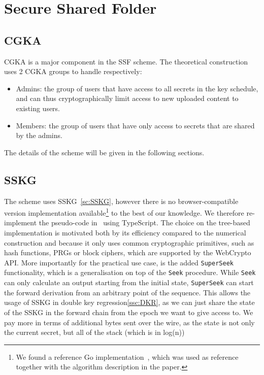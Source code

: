 \chapter{Secure Shared Folder}\label{ch:ssf}



\section{CGKA}

CGKA is a major component in the SSF scheme.
The theoretical construction uses 2 CGKA groups to handle respectively:

\begin{itemize}
    \item Admins: the group of users that have access to all secrets in the key schedule, and can thus cryptographically limit access to new uploaded content to existing users.
    \item Members: the group of users that have only access to secrets that are shared by the admins.
\end{itemize}

The details of the scheme will be given in the following sections.

\section{SSKG}\label{sc:ssf-sskg}

The scheme uses SSKG~\cref{sc:SSKG}, 
however there is no browser-compatible version implementation available\footnote{We found a reference Go implementation~\cite{SSKGGo}, which was used as reference together with the algorithm description in the paper.}
to the best of our knowledge.
We therefore re-implement the pseudo-code in~\cite{ESORICS:MarPoe14} using TypeScript.
The choice on the tree-based implementation is motivated both by its efficiency
compared to the numerical construction and because it only uses common cryptographic
primitives, such as hash functions, PRGs or block ciphers, which are supported by the WebCrypto API.
More importantly for the practical use case, is the added \texttt{SuperSeek}
functionality, which is a generalisation on top of the \texttt{Seek} procedure.
While \texttt{Seek} can only calculate an output starting from the initial state, 
\texttt{SuperSeek} can start the forward derivation from an arbitrary point of the sequence.
This allows the usage of SSKG in double key regression\cref{ssc:DKR},
as we can just share the state of the SSKG in the forward chain from 
the epoch we want to give access to. 
We pay more in terms of additional bytes sent over the wire, as the state is not only the current secret,
but all of the stack (which is in log(n)) 

